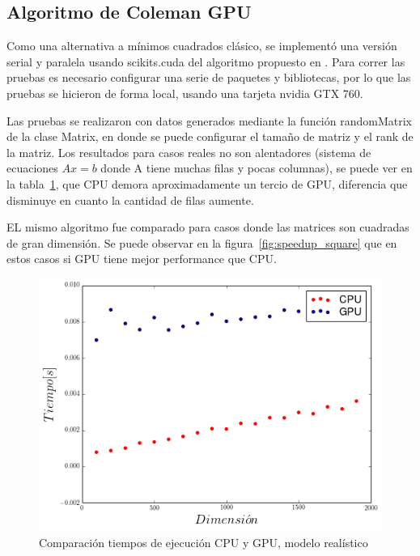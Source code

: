\subsection{Algoritmo de Coleman GPU}
Como una alternativa a mínimos cuadrados clásico, se implementó una versión
serial y paralela usando scikits.cuda del algoritmo propuesto en
\cite{coleman2010}. Para correr las pruebas es necesario configurar una
serie de paquetes y bibliotecas, por lo que las pruebas se hicieron de forma
local, usando una tarjeta nvidia GTX 760. 

Las pruebas se realizaron con datos generados mediante la función randomMatrix
de la clase Matrix, en donde se puede configurar el tamaño de matriz y el rank
de la matriz. Los resultados para casos reales no son alentadores (sistema de
ecuaciones $Ax = b$ donde A tiene muchas filas y pocas columnas), se puede ver
en la tabla~\ref{fig:speedup_real}, que CPU demora aproximadamente un tercio de
GPU, diferencia que disminuye en cuanto la cantidad de filas aumente.

EL mismo algoritmo fue comparado para casos donde las matrices son cuadradas de
gran dimensión. Se puede observar en la figura~\ref{fig:speedup_square} que en
estos casos si GPU tiene mejor performance que CPU.

\begin{figure}[h!t]
    \begin{center}
        \includegraphics[width=\textwidth]{images/speed_up_real}
        \caption{Comparación tiempos de ejecución CPU y GPU, modelo realístico}
        \label{fig:speedup_real}
    \end{center}
\end{figure}


